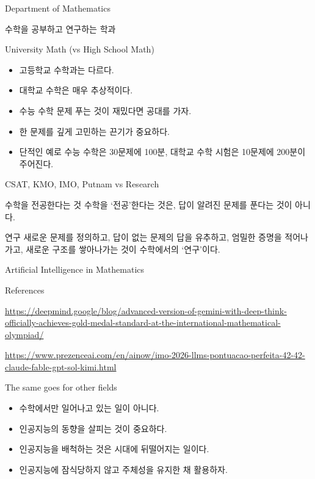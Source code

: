 \documentclass[12pt,aspectratio=169]{beamer}
\newenvironment{mainitemize}{\begin{itemize}\setlength{\itemsep}{0.72em}}{\end{itemize}}
\begin{document}
\begin{frame}{Department of Mathematics}
\vfill
\begin{center}
{\Large 수학을 공부하고 연구하는 학과}
\end{center}
\vfill
\end{frame}

\begin{frame}{University Math (vs High School Math)}
\begin{mainitemize}
  \item 고등학교 수학과는 다르다.
  \item 대학교 수학은 매우 추상적이다.
  \item 수능 수학 문제 푸는 것이 재밌다면 공대를 가자.
  \item 한 문제를 깊게 고민하는 끈기가 중요하다.
  \item 단적인 예로 수능 수학은 30문제에 100분, 대학교 수학 시험은 10문제에 200분이 주어진다.
\end{mainitemize}
\end{frame}

\begin{frame}{CSAT, KMO, IMO, Putnam vs Research}
\begin{block}{수학을 전공한다는 것}
수학을 ‘전공’한다는 것은, 답이 알려진 문제를 푼다는 것이 아니다.
\end{block}
\begin{block}{연구}
새로운 문제를 정의하고, 답이 없는 문제의 답을 유추하고, 엄밀한 증명을 적어나가고, 새로운 구조를 쌓아나가는 것이 수학에서의 ‘연구’이다.
\end{block}
\end{frame}

\begin{frame}{Artificial Intelligence in Mathematics}
\begin{block}{References}
{\scriptsize
\url{https://deepmind.google/blog/advanced-version-of-gemini-with-deep-think-officially-achieves-gold-medal-standard-at-the-international-mathematical-olympiad/}\par\medskip
\url{https://www.prezenceai.com/en/ainow/imo-2026-llms-pontuacao-perfeita-42-42-claude-fable-gpt-sol-kimi.html}
}
\end{block}
\end{frame}

\begin{frame}{The same goes for other fields}
\begin{mainitemize}
  \item 수학에서만 일어나고 있는 일이 아니다.
  \item 인공지능의 동향을 살피는 것이 중요하다.
  \item 인공지능을 배척하는 것은 시대에 뒤떨어지는 일이다.
  \item 인공지능에 잠식당하지 않고 주체성을 유지한 채 활용하자.
\end{mainitemize}
\end{frame}
\end{document}
